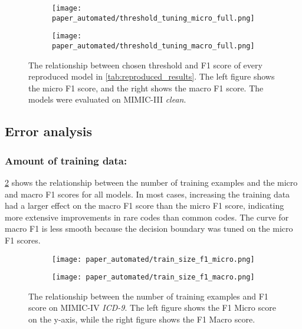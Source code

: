 {\begin{figure}[t]
    \centering
    \begin{subfigure}[b]{0.6\textheight}
        \centering
        \texttt{[image: paper\_automated/threshold\_tuning\_micro\_full.png]}
    \end{subfigure}
    \begin{subfigure}[b]{0.6\textheight}
        \centering
        \texttt{[image: paper\_automated/threshold\_tuning\_macro\_full.png]}
    \end{subfigure}%
    \caption[The relationship between chosen threshold and F1 score of every reproduced model in \cref{tab:reproduced_results}]{The relationship between chosen threshold and F1 score of every reproduced model in \cref{tab:reproduced_results}. The left figure shows the micro F1 score, and the right shows the macro F1 score. The models were evaluated on MIMIC-III \textit{clean}.}
    \label{fig:threshold_tuning}
\end{figure}


\subsection{Error analysis}

\subsubsection{Amount of training data:}

\cref{fig:train_size} shows the relationship between the number of training examples and the micro and macro F1 scores for all models.
In most cases, increasing the training data had a larger effect on the macro F1 score than the micro F1 score, indicating more extensive improvements in rare codes than common codes. The curve for macro F1 is less smooth because the decision boundary was tuned on the micro F1 scores.

\begin{figure}[t]
    \centering
    \begin{subfigure}[b]{0.6\textheight}
        \centering
        \texttt{[image: paper\_automated/train\_size\_f1\_micro.png]}
    \end{subfigure}
    \begin{subfigure}[b]{0.6\textheight}
        \centering
        \texttt{[image: paper\_automated/train\_size\_f1\_macro.png]}
    \end{subfigure}
    \caption[The relationship between the number of training examples and F1 score on MIMIC-IV \textit{ICD-9}]{The relationship between the number of training examples and F1 score on MIMIC-IV \textit{ICD-9}. The left figure shows the F1 Micro score on the y-axis, while the right figure shows the F1 Macro score.}
    \label{fig:train_size}
\end{figure}


}
